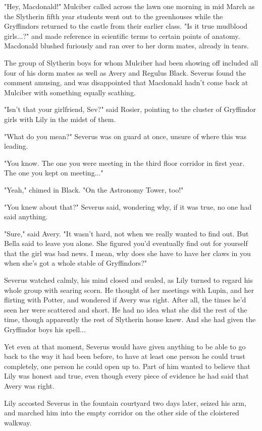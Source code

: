 \documentclass[a4paper,11pt]{article}
\begin{document}
"Hey, Macdonald!" Mulciber called across the lawn one morning in mid March as the Slytherin fifth year students went out to the greenhouses while the Gryffindors returned to the castle from their earlier class. "Is it true mudblood girls...?" and made reference in scientific terms to certain points of anatomy. Macdonald blushed furiously and ran over to her dorm mates, already in tears.

The group of Slytherin boys for whom Mulciber had been showing off included all four of his dorm mates as well as Avery and Regulus Black. Severus found the comment amusing, and was disappointed that Macdonald hadn't come back at Mulciber with something equally scathing.

"Isn't that your girlfriend, Sev?" said Rosier, pointing to the cluster of Gryffindor girls with Lily in the midst of them.

"What do you mean?" Severus was on guard at once, unsure of where this was leading.

"You know. The one you were meeting in the third floor corridor in first year. The one you kept on meeting..."

"Yeah," chimed in Black. "On the Astronomy Tower, too!"

"You knew about that?" Severus said, wondering why, if it was true, no one had said anything.

"Sure," said Avery. "It wasn't hard, not when we really wanted to find out. But Bella said to leave you alone. She figured you'd eventually find out for yourself that the girl was bad news. I mean, why does she have to have her claws in you when she's got a whole stable of Gryffindors?"

Severus watched calmly, his mind closed and sealed, as Lily turned to regard his whole group with searing scorn. He thought of her meetings with Lupin, and her flirting with Potter, and wondered if Avery was right. After all, the times he'd seen her were scattered and short. He had no idea what she did the rest of the time, though apparently the rest of Slytherin house knew. And she had given the Gryffindor boys his spell...

Yet even at that moment, Severus would have given anything to be able to go back to the way it had been before, to have at least one person he could trust completely, one person he could open up to. Part of him wanted to believe that Lily was honest and true, even though every piece of evidence he had said that Avery was right.

Lily accosted Severus in the fountain courtyard two days later, seized his arm, and marched him into the empty corridor on the other side of the cloistered walkway.
\end{document}
